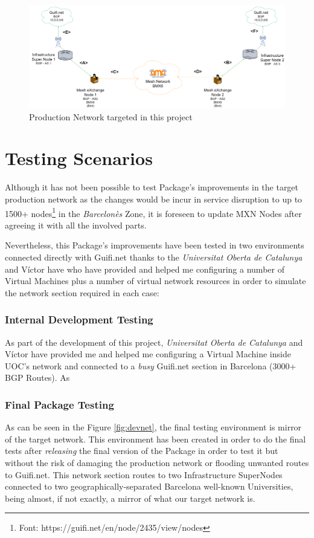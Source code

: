\begin{landscape}

\begin{figure}[ht!]
        \centering
        \includegraphics[width=\hsize]{images/targetnet}
        \caption{Production Network targeted in this project}
        \label{fig:tarnet}
	\end{figure}
\end{landscape}
\newpage

\section{Testing Scenarios}
Although it has not been possible to test Package's improvements in the target production network as the changes would be incur in service disruption to up to 1500+ nodes\footnote{Font: https://guifi.net/en/node/2435/view/nodes} in the \textit{Barcelon\`{e}s}  Zone, it is foreseen to update MXN Nodes after agreeing it with all the involved parts.

Nevertheless, this Package's improvements have been tested in two environments connected directly with Guifi.net thanks to the \textit{Universitat Oberta de Catalunya} and V\'{i}ctor have who have provided and helped me configuring a number of Virtual Machines plus a number of virtual network resources in order to simulate the network section required in each case: 

\subsubsection{Internal Development Testing}
As part of the development of this project, \textit{Universitat Oberta de Catalunya} and V\'{i}ctor have provided me and helped me configuring a Virtual Machine inside UOC's network and connected to a \textit{busy} Guifi.net section in Barcelona (3000+ BGP Routes). As 

\subsubsection{Final Package Testing}
As can be seen in the Figure \ref{fig:devnet}, the final testing environment is mirror of the target network. This environment has been created in order to do the final tests after \textit{releasing} the final version of the Package in order to test it but without the risk of damaging the production network or flooding unwanted routes to Guifi.net. This network section routes to two Infrastructure SuperNodes connected to two geographically-separated Barcelona well-known Universities, being almost, if not exactly, a mirror of what our target network is. 

